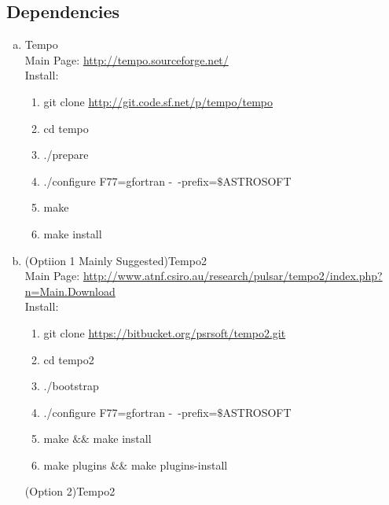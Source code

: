 \documentclass{article}
\begin{document}
\subsection{ Dependencies }
\begin{enumerate}[a.]
\item Tempo \\
	Main Page: \url{http://tempo.sourceforge.net/} \\
	Install:
	\begin{enumerate}[1):]
	\item git clone \url{http://git.code.sf.net/p/tempo/tempo} 
	\item cd tempo
	\item ./prepare
	\item ./configure F77=gfortran -~-prefix=$\$$ASTROSOFT
	\item make
	\item make install
	\end{enumerate}		 

\item (Optiion 1 Mainly Suggested)Tempo2\\
	
	Main Page: \url{http://www.atnf.csiro.au/research/pulsar/tempo2/index.php?n=Main.Download} \\
	Install:
	\begin{enumerate}[1):]
	\item git clone \url{https://bitbucket.org/psrsoft/tempo2.git}
	\item cd tempo2
	\item ./bootstrap
	\item ./configure F77=gfortran -~-prefix=$\$$ASTROSOFT
	\item make $\&\&$ make install
	\item make plugins $\&\&$ make plugins-install
	\end{enumerate}	

   (Option 2)Tempo2\\
	

\end{enumerate}
\end{document}
